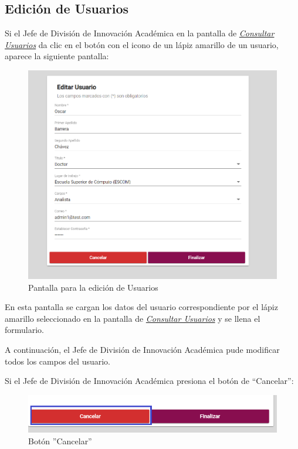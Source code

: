 \newpage

\hypertarget{editar-user}{}
\subsection{Edición de Usuarios}
Si el Jefe de División de Innovación Académica  en la pantalla de \hyperlink{consultarUs}{\textit{Consultar Usuarios}} da clic en el botón con el icono de un lápiz amarillo de un usuario, aparece la siguiente pantalla:

\begin{figure}[H]
	\centering
	\hypertarget{editarUs}{\includegraphics[width=0.6\linewidth]{images/SP5/Editar-Usuario}}
	\caption{Pantalla para la edición de Usuarios}
	\label{editarrh}
\end{figure}

En esta pantalla se cargan los datos del usuario correspondiente por el lápiz amarillo seleccionado en la pantalla de \hyperlink{consultarUs}{\textit{Consultar Usuarios}} y se llena el formulario.

A continuación, el Jefe de División de Innovación Académica  pude modificar todos los campos del usuario.

Si el Jefe de División de Innovación Académica  presiona el botón de “Cancelar”:

\begin{figure}[H]
	\centering
	\hypertarget{cancel2}{\includegraphics[width=0.7\linewidth]{images/SP5/BtnCancelar2}}
	\caption{Botón ''Cancelar''}
	\label{cancel2}
\end{figure}

